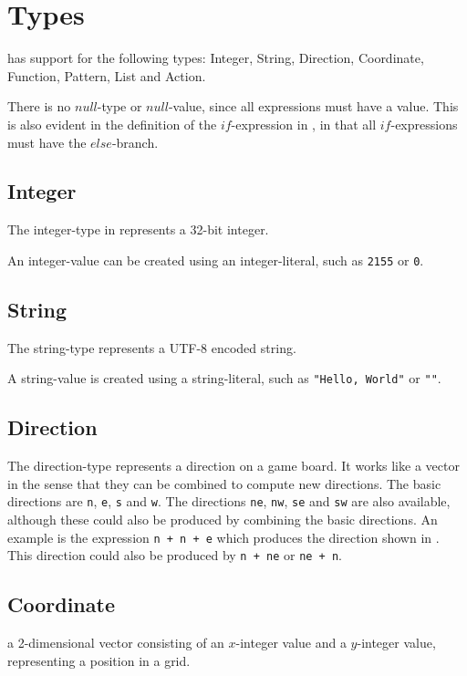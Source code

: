 \section{Types}
\label{sec:types}

\productname{} has support for the following types: Integer, String, Direction, Coordinate,
Function, Pattern, List and Action.

There is no $null$-type or $null$-value, since all expressions must have a value. This
is also evident in the definition of the $if$-expression in , in that
all $if$-expressions must have the $else$-branch.

\subsection{Integer}
The integer-type in \productname{} represents a 32-bit integer.

An integer-value can be created using an integer-literal, such as \texttt{2155} or \texttt{0}.

\subsection{String}
The string-type represents a UTF-8 encoded string.

A string-value is created using a string-literal, such as \texttt{"Hello, World"} or \texttt{""}.

\subsection{Direction}
The direction-type represents a direction on a game board. It works like a vector
in the sense that they can be combined to compute new directions. The basic directions
are \texttt{n}, \texttt{e}, \texttt{s} and \texttt{w}. The directions \texttt{ne}, \texttt{nw},
\texttt{se} and \texttt{sw} are also available, although these could also be produced
by combining the basic directions. An example is the expression \texttt{n + n + e} which produces
the direction shown in . This direction could also be produced by
\texttt{n + ne} or \texttt{ne + n}.



\subsection{Coordinate}
a 2-dimensional vector consisting of an $x$-integer value and
a $y$-integer value, representing a position in a grid.
